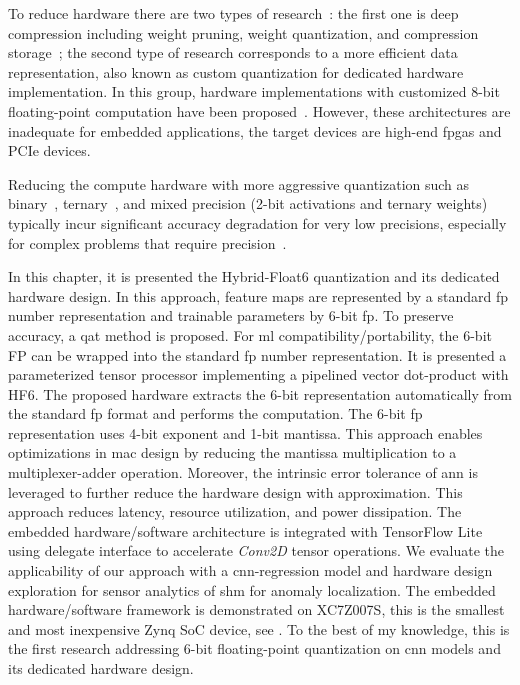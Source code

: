 To reduce hardware there are two types of research~\cite{wu2021low}: the first one is deep compression including weight pruning, weight quantization, and compression storage~\cite{han2015deep,han2015learning}; the second type of research corresponds to a more efficient data representation, also known as custom quantization for dedicated hardware implementation. In this group, hardware implementations with customized 8-bit floating-point computation have been proposed~\cite{mei2017200mhz, wu2021low, lian2019high}. However, these architectures are inadequate for embedded applications, the target devices are high-end \glspl{fpga} and PCIe devices.

Reducing the compute hardware with more aggressive quantization such as binary~\cite{courbariaux2015binaryconnect}, ternary~\cite{lin2015neural}, and mixed precision (2-bit activations and ternary weights)~\cite{colangelo2018exploration} typically incur significant accuracy degradation for very low precisions, especially for complex problems that require precision~\cite{faraone2019addnet}.

In this chapter, it is presented the Hybrid-Float6 quantization and its dedicated hardware design. In this approach, feature maps are represented by a standard \gls{fp} number representation and trainable parameters by 6-bit \gls{fp}. To preserve accuracy, a \gls{qat} method is proposed. For \gls{ml} compatibility/portability, the 6-bit FP can be wrapped into the standard \gls{fp} number representation. It is presented a parameterized tensor processor implementing a pipelined vector dot-product with HF6. The proposed hardware extracts the 6-bit representation automatically from the standard \gls{fp} format and performs the computation. The 6-bit \gls{fp} representation uses 4-bit exponent and 1-bit mantissa. This approach enables optimizations in \gls{mac} design by reducing the mantissa multiplication to a multiplexer-adder operation. Moreover, the intrinsic error tolerance of \gls{ann} is leveraged to further reduce the hardware design with approximation. This approach reduces latency, resource utilization, and power dissipation. The embedded hardware/software architecture is integrated with TensorFlow Lite using delegate interface to accelerate \emph{Conv2D} tensor operations. We evaluate the applicability of our approach with a \gls{cnn}-regression model and hardware design exploration for sensor analytics of \gls{shm} for anomaly localization. The embedded hardware/software framework is demonstrated on XC7Z007S, this is the smallest and most inexpensive Zynq SoC device, see . To the best of my knowledge, this is the first research addressing 6-bit floating-point quantization on \gls{cnn} models and its dedicated hardware design.

